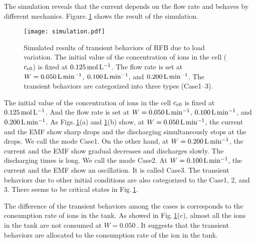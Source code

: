 \documentclass[a4paper]{article}
\newcommand{\figref}[1]{Fig.\,\ref{#1}}
\newcommand{\mfigref}[2]{Fig.\,\ref{#1}(#2)}
\newcommand{\mfigsref}[3]{Figs.\,\ref{#1}(#2) and \ref{#1}(#3)}
\newcommand{\ifigref}[1]{Figure.\,\ref{#1}}
\newcommand{\Cco}{c_{\rm c0}}
\newcommand{\M}{{\rm mol\,L^{-1}}}
\newcommand{\fr}{{\rm L\,min^{-1}}}
\begin{document}
The simulation reveals that 
the current depends on the flow rate 
and behaves by different mechanics. 
\ifigref{fig:simulation} shows the result of the simulation.
\begin{figure}[h]
  \centering
 \texttt{[image: simulation.pdf]}
 \caption{Simulated results of transient behaviors of RFB due to load variation. The initial value of the concentration of ions in the cell ($\Cco$) is fixed at $0.125\,\M$. The flow rate is set at $W=0.050\,\fr$, $0.100\,\fr$, and $0.200\,\fr$. The transient behaviors are categorized into three types (Case1--3). }
 \label{fig:simulation}
 \end{figure}
The initial value of the concentration of ions in the cell $\Cco$ is fixed at $0.125\,\M$. 
And the flow rate is set at $W=0.050\,\fr$, $0.100\,\fr$, and $0.200\,\fr$. 
As \mfigsref{fig:simulation}{a}{b} show, 
at $W=0.050\,\fr$, the current and the EMF show
sharp drops and 
the discharging simultaneously stops at the drops. 
We call the mode Case1. 
On the other hand, at $W=0.200\,\fr$, 
the current and the EMF show 
gradual decreases 
and discharges slowly. 
The discharging times is long. 
We call the mode Case2. 
At $W=0.100\,\fr$,
the current and the EMF show an oscillation. 
It is called Case3. 
The transient behaviors due to other initial conditions 
are also categorized to the Case1, 2, and 3. 
There seems to be critical states in \figref{fig:simulation}.

The difference of the transient behaviors among the cases 
is corresponds to the consumption rate of ions in the tank. 
As showed in \mfigref{fig:simulation}{c}, 
almost all the ions in the tank 
are not consumed at $W=0.050\,$. 
It suggests that the transient behaviors 
are allocated to the consumption rate of the ion in the tank.
\end{document}
